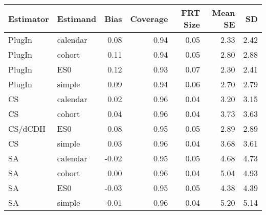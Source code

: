 \captionsetup[table]{labelformat=empty,skip=1pt}
\begin{longtable}{llrrrrr}
\toprule
Estimator & Estimand & Bias & Coverage & FRT Size & Mean SE & SD \\ 
\midrule
PlugIn & calendar & 0.08 & 0.94 & 0.05 & 2.33 & 2.42 \\ 
PlugIn & cohort & 0.11 & 0.94 & 0.05 & 2.80 & 2.88 \\ 
PlugIn & ES0 & 0.12 & 0.93 & 0.07 & 2.30 & 2.41 \\ 
PlugIn & simple & 0.09 & 0.94 & 0.06 & 2.70 & 2.79 \\ 
CS & calendar & 0.02 & 0.96 & 0.04 & 3.20 & 3.15 \\ 
CS & cohort & 0.04 & 0.96 & 0.04 & 3.73 & 3.63 \\ 
CS/dCDH & ES0 & 0.08 & 0.95 & 0.05 & 2.89 & 2.89 \\ 
CS & simple & 0.03 & 0.96 & 0.04 & 3.68 & 3.61 \\ 
SA & calendar & -0.02 & 0.95 & 0.05 & 4.68 & 4.73 \\ 
SA & cohort & 0.00 & 0.96 & 0.04 & 5.04 & 4.93 \\ 
SA & ES0 & -0.03 & 0.95 & 0.05 & 4.38 & 4.39 \\ 
SA & simple & -0.01 & 0.96 & 0.04 & 5.20 & 5.14 \\ 
 \bottomrule
\end{longtable}


